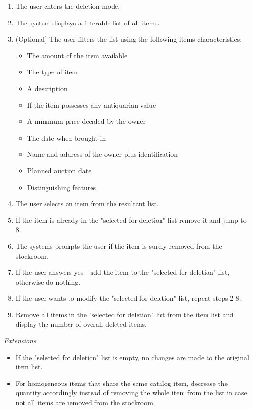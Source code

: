 \documentclass{article}
\begin{document}
\begin{enumerate}[noitemsep]
	\item The user enters the deletion mode.
	\item The system displays a filterable list of all items.
	\item (Optional) The user filters the list using the following items characteristics:
	\begin{itemize}[noitemsep]
		\item The amount of the item available
		\item The type of item
		\item A description
		\item If the item possesses any antiquarian value
		\item A minimum price decided by the owner
		\item The date when brought in
		\item Name and address of the owner plus identification
		\item Planned auction date
		\item Distinguishing features
	\end{itemize}
	\item The user selects an item from the resultant list.
	\item If the item is already in the  "selected for deletion" list remove it and jump to 8.
	\item The systems prompts the user if the item is surely removed from the stockroom.
	\item If the user answers yes - add the item to the "selected for deletion" list, otherwise do nothing.
	\item If the user wants to modify the "selected for deletion" list, repeat steps 2-8.
	\item Remove all items in the "selected for deletion" list from the item list and display the number of overall deleted items.
\end{enumerate}
\textsl{Extensions}
\begin{itemize}[noitemsep]
	\item If the "selected for deletion" list is empty, no changes are made to the original item list.
	\item For homogeneous items that share the same catalog item, decrease the quantity accordingly instead of removing the whole item from the list in case not all items are removed from the stockroom.  \\
\end{itemize}
\end{document}
